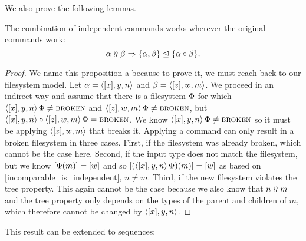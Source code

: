 We also prove the following lemmas.

\begin{myax}\label{combine_independent_commands}
The combination of independent commands works wherever the original commands work:
\[ \alpha\mathrel{\wr\wr} \beta \Rightarrow {\{\alpha, \beta\}}\trianglelefteq{\{\alpha\circ\beta\}}. \]
\end{myax}
\begin{proof}
We name this proposition a  
because to prove it, we must reach back to our filesystem model.
Let $\alpha=\langle{[x],y,n}\rangle$ and $\beta=\langle{[z],w,m}\rangle$.
We proceed in an indirect way and
assume that there is a filesystem $\Phi$ for which
$\langle{[x],y,n}\rangle\,\Phi\neq\text{\normalfont\scshape{broken}}$ and $\langle{[z],w,m}\rangle\,\Phi\neq\text{\normalfont\scshape{broken}}$, but
$\langle{[x],y,n}\rangle\circ \langle{[z],w,m}\rangle\,\Phi=\text{\normalfont\scshape{broken}}$.
We know $\langle{[x],y,n}\rangle\,\Phi\neq\text{\normalfont\scshape{broken}}$ so it must be applying 
$\langle{[z],w,m}\rangle$ that breaks it.
Applying a command can only result in a broken filesystem in three cases.
First, if the filesystem was already broken, which cannot be the case here.
Second, if the input type does not match the filesystem,
but we know $[\Phi(m)]=[w]$ and so
$[(\langle{[x],y,n}\rangle\,\Phi)(m)]=[w]$ as based on \cref{incomparable_is_independent}, $n\neq m$.
Third, if the new filesystem violates the tree property.
This again cannot be the case because we also know that $n\mathrel{\wr\wr} m$
and the tree property only depends on the types of the parent and children of $m$,
which therefore cannot be changed by $\langle{[x],y,n}\rangle$.
\end{proof}

This result can be extended to sequences:

